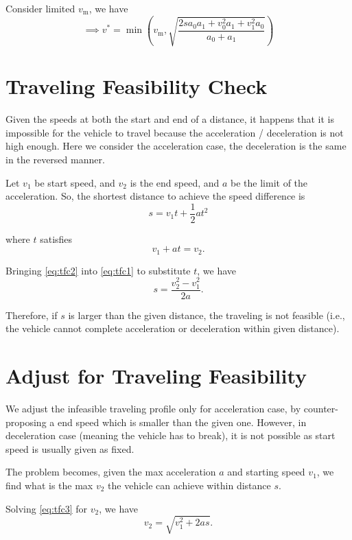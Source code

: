 \documentclass[11pt,a4paper]{article}
\begin{document}
Consider limited $v_\text{m}$, we have 
$$\implies v^* = \min\left(v_\text{m}, \sqrt{\frac{2s a_0 a_1 + v_0^2 a_1 + v_1^2 a_0}{a_0 + a_1}}\right) $$

\section{Traveling Feasibility Check}

Given the speeds at both the start and end of a distance, it happens that it is impossible for the vehicle to travel because the acceleration / deceleration is not high enough. Here we consider the acceleration case, the deceleration is the same in the reversed manner.

Let $v_1$ be start speed, and $v_2$ is the end speed, and $a$ be the limit of the acceleration. So, the shortest distance to achieve the speed difference is
\begin{equation}
\label{eq:tfc1}
s = v_1 t + \frac{1}{2} a t^2
\end{equation}

where $t$ satisfies 
\begin{equation}
\label{eq:tfc2}
v_1 + at = v_2 .
\end{equation}

Bringing \eqref{eq:tfc2} into \eqref{eq:tfc1} to substitute $t$, we have
\begin{equation}
\label{eq:tfc3}
s = \frac{v_2^2 - v_1^2}{2a}.
\end{equation}

Therefore, if $s$ is larger than the given distance, the traveling is not feasible (i.e., the vehicle cannot complete acceleration or deceleration within given distance).

\section{Adjust for Traveling Feasibility}

We adjust the infeasible traveling profile only for acceleration case, by counter-proposing a end speed which is smaller than the given one. However, in deceleration case (meaning the vehicle has to break), it is not possible as start speed is usually given as fixed.

The problem becomes, given the max acceleration $a$ and starting speed $v_1$, we find what is the max $v_2$ the vehicle can achieve within distance $s$.

Solving \eqref{eq:tfc3} for $v_2$, we have 
\begin{equation}
v_2 = \sqrt{v_1^2 + 2as}.
\end{equation}
\end{document}
